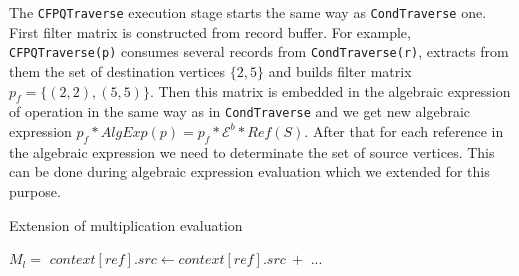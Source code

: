 The \lstinline{CFPQTraverse} execution stage starts the same way as \lstinline{CondTraverse} one. First filter matrix is constructed from record buffer. For example, \lstinline{CFPQTraverse(p)} consumes several records from \lstinline{CondTraverse(r)}, extracts from them the set of destination vertices $\{2, 5\}$ and builds filter matrix $p_f = \{(2, 2), (5, 5)\}$. Then this matrix is embedded in the algebraic expression of operation in the same way as in \lstinline{CondTraverse} and we get new algebraic expression $p_f * AlgExp(p) = p_f * \mathcal{E}^b * Ref(S)$. After that for each reference in the algebraic expression we need to determinate the set of source vertices. This can be done during algebraic expression evaluation which we extended for this purpose.

\begin{algorithm}
\begin{algorithmic}[1]
\caption{Extension of multiplication evaluation}
\label{alg:multiplication-extension}
\State $M_l =$ 
    \State $context[ref].src \gets context[ref].src~+$ 
\EndIf
\State $...$ 
\EndFunction
\end{algorithmic}
\end{algorithm}


